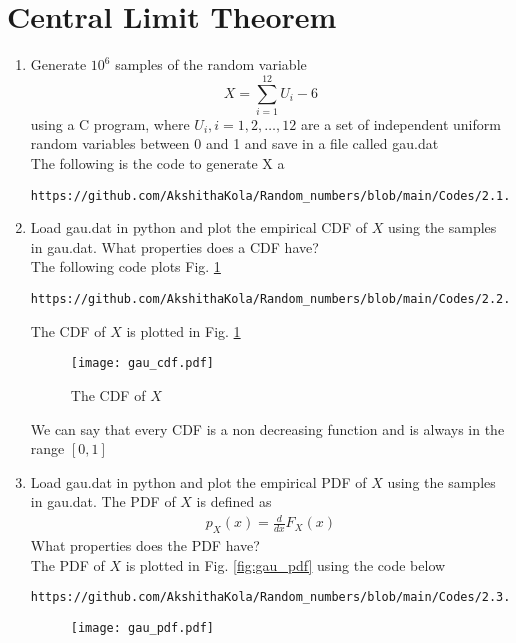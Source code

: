 \documentclass[journal,12pt,twocolumn]{IEEEtran}
\renewcommand\thesection{\arabic{section}}
\begin{document}
\section{Central Limit Theorem}
%
\begin{enumerate}[label=\thesection.\arabic*
,ref=\thesection.\theenumi]
%
\item
Generate $10^6$ samples of the random variable
%
\begin{equation}
X = \sum_{i=1}^{12}U_i -6
\end{equation}
%
using a C program, where $U_i, i = 1,2,\dots, 12$ are  a set of independent uniform random variables between 0 and 1
and save in a file called gau.dat \\
\solution The following is the code to generate X a
\begin{lstlisting}
https://github.com/AkshithaKola/Random_numbers/blob/main/Codes/2.1.c
\end{lstlisting}
%
\item
Load gau.dat in python and plot the empirical CDF of $X$ using the samples in gau.dat. What properties does a CDF have?
\\
\solution The following code plots Fig. \ref{fig:gau_cdf} \\
\begin{lstlisting}
https://github.com/AkshithaKola/Random_numbers/blob/main/Codes/2.2.py
\end{lstlisting}
The CDF of $X$ is plotted in Fig. \ref{fig:gau_cdf}\\
\begin{figure}
\centering
\texttt{[image: gau\_cdf.pdf]}
\caption{The CDF of $X$}
\label{fig:gau_cdf}
\end{figure}
We can say that every CDF is a non decreasing function and is always in the range $[0,1]$
\item
Load gau.dat in python and plot the empirical PDF of $X$ using the samples in gau.dat. The PDF of $X$ is defined as
\begin{align}
p_{X}(x) = \frac{d}{dx}F_{X}(x)
\end{align}
What properties does the PDF have?
\\
\solution The PDF of $X$ is plotted in Fig. \ref{fig:gau_pdf} using the code below
\begin{lstlisting}
https://github.com/AkshithaKola/Random_numbers/blob/main/Codes/2.3.py
\end{lstlisting}
\begin{figure}
\centering
\texttt{[image: gau\_pdf.pdf]}

\end{figure}
\end{enumerate}
\end{document}
